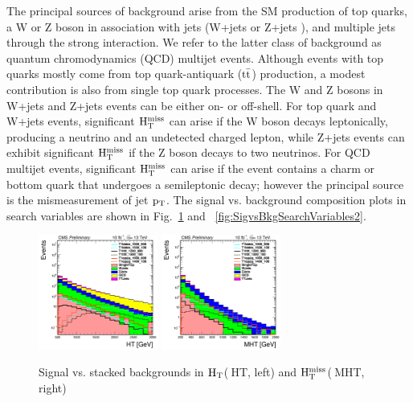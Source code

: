 The principal sources of background arise from the SM production of top quarks, a W or Z
boson in association with jets (W+jets or Z+jets ), and multiple jets through the strong
interaction. We refer to the latter class of background as quantum chromodynamics (QCD)
multijet events. Although events with top quarks mostly come from top quark-antiquark ($\rm t\bar{t}$) production,
a modest contribution is also from single top quark processes. The W and Z bosons in W+jets and Z+jets events
can be either on- or off-shell. For top quark and W+jets events, significant $\rm H_{T}^{miss}$  can arise if the
W boson decays leptonically, producing a neutrino and an undetected charged lepton, while
Z+jets events can exhibit significant $\rm H_{T}^{miss}$ if the Z boson decays to two neutrinos. For QCD
multijet events, significant $\rm H_{T}^{miss}$ can arise if the event contains a charm or bottom quark that
undergoes a semileptonic decay; however the principal source is the mismeasurement of
jet $\rm p_{T}$. The signal vs. background composition plots in search variables are shown in Fig.~\ref{fig:SigvsBkgSearchVariables1} and ~\ref{fig:SigvsBkgSearchVariables2}.

\begin{figure}[h]
\begin{center}
\includegraphics[width=0.35\textwidth]{HT_distribution.png}
\includegraphics[width=0.35\textwidth]{MHT_distribution.png}
\caption{\label{fig:SigvsBkgSearchVariables1} Signal vs. stacked backgrounds in $\rm H_{T}$($~$HT, left) and $\rm H_{T}^{miss}$($~$MHT, right)}
\end{center}
\end{figure}

